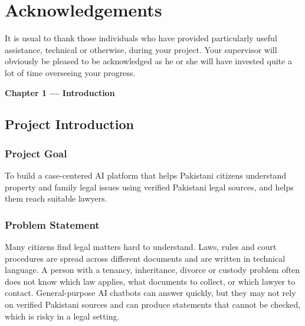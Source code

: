 \documentclass[12pt,a4paper]{report}
\begin{document}
\chapter*{Acknowledgements}
It is usual to thank those individuals who have provided particularly useful assistance, technical or otherwise, during your project. Your supervisor will obviously be pleased to be acknowledged as he or she will have invested quite a lot of time overseeing your progress.
\clearpage


\tableofcontents
\clearpage
\listoffigures
\vspace{1.5em}
{\let\clearpage\relax\let\cleardoublepage\relax\listoftables}
\clearpage

{}
{\noindent\normalfont\fontsize{24}{28}\selectfont\bfseries Chapter 1 --- Introduction\par}
\vspace{12pt}
\setcounter{chapter}{1}
\setcounter{section}{0}

\section{Project Introduction}

\subsection{Project Goal}
To build a case-centered AI platform that helps Pakistani citizens understand property and family legal issues using verified Pakistani legal sources, and helps them reach suitable lawyers.

\subsection{Problem Statement}
Many citizens find legal matters hard to understand. Laws, rules and court procedures are spread across different documents and are written in technical language. A person with a tenancy, inheritance, divorce or custody problem often does not know which law applies, what documents to collect, or which lawyer to contact. General-purpose AI chatbots can answer quickly, but they may not rely on verified Pakistani sources and can produce statements that cannot be checked, which is risky in a legal setting.
\end{document}
